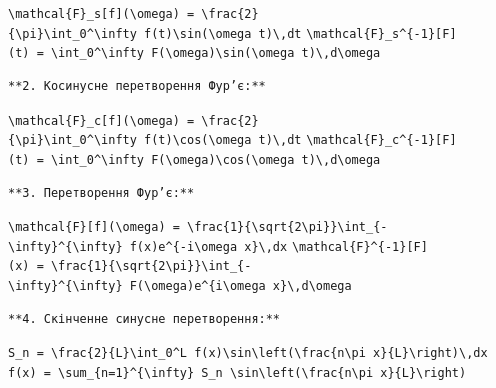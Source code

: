 \documentclass[
  ukrainian,
]{article}
\begin{document}
\texttt{\textbackslash{}mathcal\{F\}\_s{[}f{]}(\textbackslash{}omega)\ =\ \textbackslash{}frac\{2\}\{\textbackslash{}pi\}\textbackslash{}int\_0\^{}\textbackslash{}infty\ f(t)\textbackslash{}sin(\textbackslash{}omega\ t)\textbackslash{},dt}
\texttt{\textbackslash{}mathcal\{F\}\_s\^{}\{-1\}{[}F{]}(t)\ =\ \textbackslash{}int\_0\^{}\textbackslash{}infty\ F(\textbackslash{}omega)\textbackslash{}sin(\textbackslash{}omega\ t)\textbackslash{},d\textbackslash{}omega}

\begin{verbatim}
**2. Косинусне перетворення Фур’є:**
\end{verbatim}

\texttt{\textbackslash{}mathcal\{F\}\_c{[}f{]}(\textbackslash{}omega)\ =\ \textbackslash{}frac\{2\}\{\textbackslash{}pi\}\textbackslash{}int\_0\^{}\textbackslash{}infty\ f(t)\textbackslash{}cos(\textbackslash{}omega\ t)\textbackslash{},dt}
\texttt{\textbackslash{}mathcal\{F\}\_c\^{}\{-1\}{[}F{]}(t)\ =\ \textbackslash{}int\_0\^{}\textbackslash{}infty\ F(\textbackslash{}omega)\textbackslash{}cos(\textbackslash{}omega\ t)\textbackslash{},d\textbackslash{}omega}

\begin{verbatim}
**3. Перетворення Фур’є:**
\end{verbatim}

\texttt{\textbackslash{}mathcal\{F\}{[}f{]}(\textbackslash{}omega)\ =\ \textbackslash{}frac\{1\}\{\textbackslash{}sqrt\{2\textbackslash{}pi\}\}\textbackslash{}int\_\{-\textbackslash{}infty\}\^{}\{\textbackslash{}infty\}\ f(x)e\^{}\{-i\textbackslash{}omega\ x\}\textbackslash{},dx}
\texttt{\textbackslash{}mathcal\{F\}\^{}\{-1\}{[}F{]}(x)\ =\ \textbackslash{}frac\{1\}\{\textbackslash{}sqrt\{2\textbackslash{}pi\}\}\textbackslash{}int\_\{-\textbackslash{}infty\}\^{}\{\textbackslash{}infty\}\ F(\textbackslash{}omega)e\^{}\{i\textbackslash{}omega\ x\}\textbackslash{},d\textbackslash{}omega}

\begin{verbatim}
**4. Скінченне синусне перетворення:**
\end{verbatim}

\texttt{S\_n\ =\ \textbackslash{}frac\{2\}\{L\}\textbackslash{}int\_0\^{}L\ f(x)\textbackslash{}sin\textbackslash{}left(\textbackslash{}frac\{n\textbackslash{}pi\ x\}\{L\}\textbackslash{}right)\textbackslash{},dx}
\texttt{f(x)\ =\ \textbackslash{}sum\_\{n=1\}\^{}\{\textbackslash{}infty\}\ S\_n\ \textbackslash{}sin\textbackslash{}left(\textbackslash{}frac\{n\textbackslash{}pi\ x\}\{L\}\textbackslash{}right)}
\end{document}
